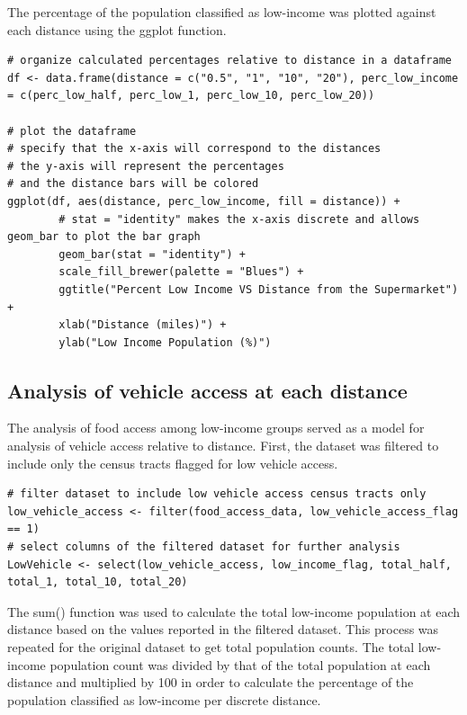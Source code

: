 \documentclass[letterpaper]{article} %
\begin{document}
The percentage of the population classified as low-income was plotted against each distance using the ggplot function. 

\lstset{language=R}
\begin{lstlisting}[frame=single]
# organize calculated percentages relative to distance in a dataframe
df <- data.frame(distance = c("0.5", "1", "10", "20"), perc_low_income = c(perc_low_half, perc_low_1, perc_low_10, perc_low_20))

# plot the dataframe 
# specify that the x-axis will correspond to the distances
# the y-axis will represent the percentages
# and the distance bars will be colored
ggplot(df, aes(distance, perc_low_income, fill = distance)) + 
        # stat = "identity" makes the x-axis discrete and allows geom_bar to plot the bar graph
        geom_bar(stat = "identity") + 
        scale_fill_brewer(palette = "Blues") +
        ggtitle("Percent Low Income VS Distance from the Supermarket") +
        xlab("Distance (miles)") +
        ylab("Low Income Population (%)")

\end{lstlisting}

\subsection{Analysis of vehicle access at each distance}

The analysis of food access among low-income groups served as a model for analysis of vehicle access relative to distance. First, the dataset was filtered to include only the census tracts flagged for low vehicle access. 

\lstset{language=R}
\begin{lstlisting}[frame=single]   
# filter dataset to include low vehicle access census tracts only
low_vehicle_access <- filter(food_access_data, low_vehicle_access_flag == 1)
# select columns of the filtered dataset for further analysis
LowVehicle <- select(low_vehicle_access, low_income_flag, total_half, total_1, total_10, total_20)
\end{lstlisting}

The sum() function was used to calculate the total low-income population at each distance based on the values reported in the filtered dataset. This process was repeated for the original dataset to get total population counts. The total low-income population count was divided by that of the total population at each distance and multiplied by 100 in order to calculate the percentage of the population classified as low-income per discrete distance. 
\end{document}
